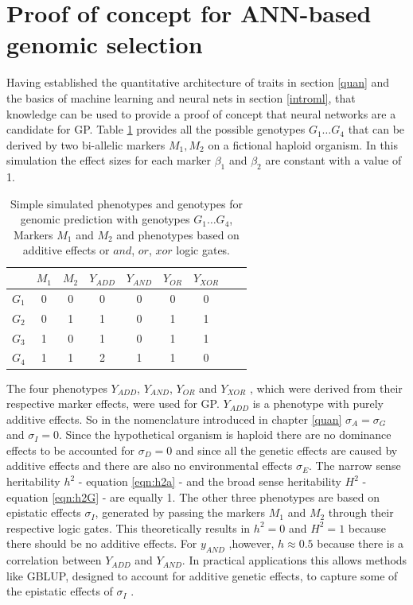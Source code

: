 \section{Proof of concept for ANN-based genomic selection} \label{POC}

Having established the quantitative architecture of traits in section \ref{quan} and the
basics of machine learning and neural nets in section \ref{introml}, that knowledge can be
used to provide a proof of concept that neural networks are a candidate for GP. Table
\ref{tab:simmarker} provides all the possible genotypes $G_1 \dots G_4$ that can be
derived by two bi-allelic markers $M_1,M_2$ on a fictional haploid organism. In this
simulation the effect sizes for each marker $\beta_1$ and $\beta_2$ are constant with a
value of 1.

\begin{table}[H]
  \caption{Simple simulated phenotypes and genotypes for genomic prediction with genotypes
    $G_1 \dots G_4$, Markers $M_1$ and $M_2$ and phenotypes based on additive effects or
    $and$, $or$, $xor$ logic gates.}
\label{tab:simmarker}
\centering
\begin{tabular}{ l c c | c c c c c c }
  \toprule
  & $M_1$ & $M_2$ & $Y_{ADD}$ & $Y_{AND}$ & $Y_{OR}$ & $Y_{XOR}$\\
  \midrule
  $G_1$ & 0 & 0 & 0 & 0 & 0 & 0 \\
  $G_2$ & 0 & 1 & 1 & 0 & 1 & 1 \\
  $G_3$ & 1 & 0 & 1 & 0 & 1 & 1 \\
  $G_4$ & 1 & 1 & 2 & 1 & 1 & 0 \\
  \bottomrule
\end{tabular}
\end{table}

The four phenotypes $Y_{ADD}$, $Y_{AND}$, $Y_{OR}$ and $Y_{XOR}$ , which were derived from
their respective marker effects, were used for GP. $Y_{ADD}$ is a phenotype with purely
additive effects. So in the nomenclature introduced in chapter \ref{quan}
$\sigma_A = \sigma_G$ and $\sigma_{I} = 0$. Since the hypothetical organism is haploid
there are no dominance effects to be accounted for $\sigma_D = 0$ and since all the
genetic effects are caused by additive effects and there are also no environmental effects
$\sigma_E$.  The narrow sense heritability $h^2$ - equation \ref{eqn:h2a} - and the broad
sense heritability $H^2$ - equation \ref{eqn:h2G} - are equally 1. The other three
phenotypes are based on epistatic effects $\sigma_I$, generated by passing the markers
$M_1$ and $M_2$ through their respective logic gates. This theoretically results in
$h^2 = 0$ and $H^2 = 1$ because there should be no additive effects. For $y_{AND}$
,however, $h \approx 0.5$ because there is a correlation between $Y_{ADD}$ and
$Y_{AND}$. In practical applications this allows methods like GBLUP, designed to account
for additive genetic effects, to capture some of the epistatic effects of $\sigma_I$
\cite{vieira2017assessing}.

